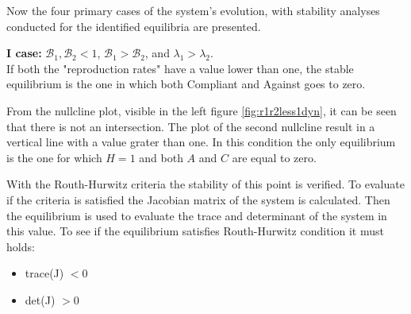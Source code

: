Now the four primary cases of the system’s evolution, with stability analyses conducted for the identified equilibria are presented.

\textbf{I case: }$\mathcal{B}_1, \mathcal{B}_2 <1$, $\mathcal{B}_1 >  \mathcal{B}_2$, and $\lambda_1 > \lambda_2$. \\
If both the "reproduction rates" have a value lower than one, the stable equilibrium is the one in which both Compliant and Against goes to zero. 

From the nullcline plot, visible in the left figure \ref{fig:r1r2less1dyn}, it can be seen that there is not an intersection. The plot of the second nullcline result in a vertical line with a value grater than one. In this condition the only equilibrium is the one for which $H = 1$ and both $A$ and $C$ are equal to zero. 

With the Routh-Hurwitz criteria the stability of this point is verified. To evaluate if the criteria is satisfied the Jacobian matrix of the system is calculated. Then the equilibrium is used to evaluate the trace and determinant of the system in this value. To see if the equilibrium satisfies Routh-Hurwitz condition it must holds:
\begin{itemize}
	\item trace(J) $< 0$
	\item det(J) $> 0$
\end{itemize}
 
